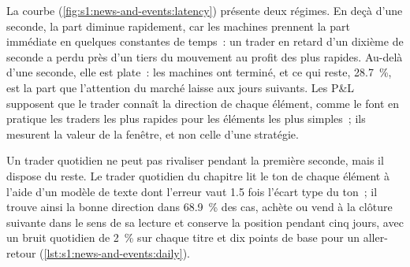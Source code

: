 La courbe (\cref{fig:s1:news-and-events:latency}) présente deux régimes. En deçà d'une seconde, la part diminue rapidement, car les machines prennent la part immédiate
en quelques constantes de temps~: un trader en retard d'un dixième de seconde a perdu près d'un tiers du mouvement au profit des plus rapides. Au-delà d'une seconde, elle est plate~: les machines ont terminé, et
ce qui reste, 28.7~\%, est la part que l'attention du marché laisse aux jours suivants. Les P\&L supposent que le trader connaît la direction de
chaque élément, comme le font en pratique les traders les plus rapides pour les éléments les plus simples~; ils mesurent la valeur de la fenêtre, et non celle d'une stratégie.

\begin{omfigure}

\label{fig:s1:news-and-events:latency}
\end{omfigure}

Un trader quotidien ne peut pas rivaliser pendant la première seconde, mais il dispose du reste. Le trader quotidien du chapitre lit le ton de chaque élément à l'aide d'un modèle de texte dont l'erreur
vaut 1.5 fois l'écart type du ton~; il trouve ainsi la bonne direction dans 68.9~\% des cas, achète ou vend à la clôture suivante dans le sens de sa lecture et
conserve la position pendant cinq jours, avec un bruit quotidien de 2~\% sur chaque titre et dix points de base pour un aller-retour (\cref{lst:s1:news-and-events:daily}).


